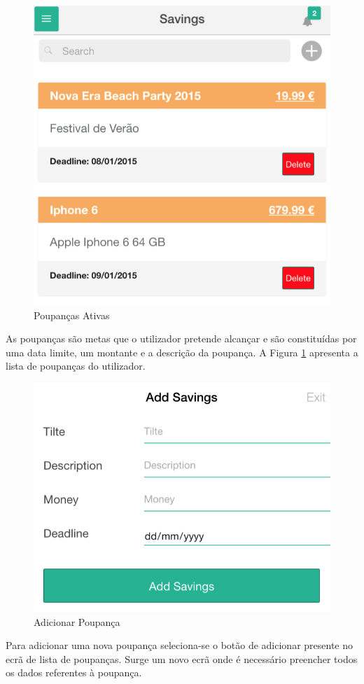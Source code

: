 \begin{figure}[H]
	\begin{center}
		\includegraphics[width=0.5
		\textwidth]{savings/savings.png}
	\end{center}
	\caption{Poupanças Ativas}
	\label{fig:7}
\end{figure}

As poupanças são metas que o utilizador pretende alcançar e são constituídas por uma data limite, um montante e a descrição da poupança. A Figura \ref{fig:7} apresenta a lista de poupanças do utilizador.

\begin{figure}[H]
	\begin{center}
		\includegraphics[width=0.5
		\textwidth]{savings/addSavings.png}
	\end{center}
	\caption{Adicionar Poupança}
	\label{fig:7_1}
\end{figure}

Para adicionar uma nova poupança seleciona-se o botão de adicionar presente no ecrã de lista de poupanças. Surge um novo ecrã onde é necessário preencher todos os dados referentes à poupança.